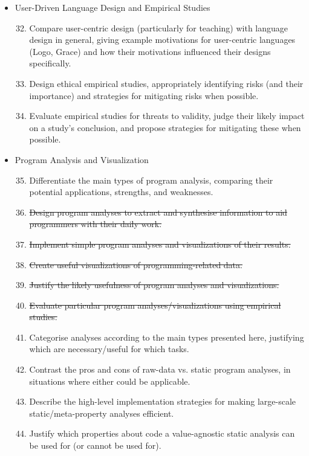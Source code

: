 \documentclass{article}
\begin{document}
\begin{itemize}
\begin{enumerate}
    \end{enumerate}
    \item User-Driven Language Design and Empirical Studies
    \begin{enumerate}
        \setcounter{enumi}{31}
        \item Compare user-centric design (particularly for teaching) with language design in general, giving example motivations for user-centric languages (Logo, Grace) and how their motivations influenced their designs specifically.
        \item Design ethical empirical studies, appropriately identifying risks (and their importance) and strategies for mitigating risks when possible.
        \item Evaluate empirical studies for threats to validity, judge their likely impact on a study's conclusion, and propose strategies for mitigating these when possible.
    \end{enumerate}
    \item Program Analysis and Visualization
    \begin{enumerate}
        \setcounter{enumi}{34}
        \item Differentiate the main types of program analysis, comparing their potential applications, strengths, and weaknesses.
        \item \sout{Design program analyses to extract and synthesise information to aid programmers with their daily work.}
        \item \sout{Implement simple program analyses and visualizations of their results.}
        \item \sout{Create useful visualizations of programming-related data.}
        \item \sout{Justify the likely usefulness of program analyses and visualizations.}
        \item \sout{Evaluate particular program analyses/visualizations using empirical studies.}
        \item Categorise analyses according to the main types presented here, justifying which are necessary/useful for which tasks.
        \item Contrast the pros and cons of raw-data vs. static program analyses, in situations where either could be applicable.
        \item Describe the high-level implementation strategies for making large-scale static/meta-property analyses efficient.
        \item Justify which properties about code a value-agnostic static analysis can be used for (or cannot be used for).

\end{enumerate}
\end{itemize}
\end{document}
